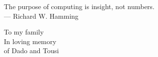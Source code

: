 \cleardoublepage
\thispagestyle{empty}

\vspace*{3cm}

\begin{raggedleft}
	The purpose of computing is insight, not numbers. \\
	--- Richard W. Hamming \\
\end{raggedleft}

\vspace{4cm}

\begin{raggedleft}
	To my family\\
	In loving memory \\
	of Dado and Tousi\\
\end{raggedleft}

